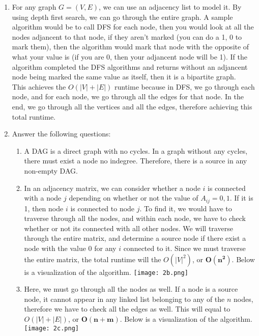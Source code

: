 \documentclass{article}
\begin{document}
    \begin{enumerate}
        \item For any graph $G = (V,E)$, we can use an adjacency list to model it. By using depth first search, we can go through the entire graph. A sample algorithm would be to call DFS for each node, then you would look at all the nodes adjancent to that node, if they aren't marked (you can do a 1, 0 to mark them), then the algorithm would mark that node with the opposite of what your value is (if you are 0, then your adjancent node will be 1). If the algorithm completed the DFS algorithms and returns without an adjancent node being marked the same value as itself, then it is a bipartite graph.\\
        This achieves the $O(|V| + |E|)$ runtime because in DFS, we go through each node, and for each node, we go through all the edges for that node. In the end, we go through all the vertices and all the edges, therefore achieving this total runtime.
        \item Answer the following questions:
        \begin{enumerate}
            \item A DAG is a direct graph with no cycles. In a graph without any cycles, there must exist a node no indegree. Therefore, there is a source in any non-empty DAG.
            \item In an adjacency matrix, we can consider whether a node $i$ is connected with a node $j$ depending on whether or not the value of $A_{ij} = 0,1$. If it is 1, then node $i$ is connected to node $j$. To find it, we would have to traverse through all the nodes, and within each node, we have to check whether or not its connected with all other nodes. We will traverse through the entire matrix, and determine a source node if there exist a node with the value $0$ for any $i$ connected to it. Since we must traverse the entire matrix, the total runtime will the $O(|V|^2)$, or $\boxed{\mathbf{O(n^2)}}$. Below is a visualization of the algorithm.
            \texttt{[image: 2b.png]}
            \item Here, we must go through all the nodes as well. If a node is a source node, it cannot appear in any linked list belonging to any of the $n$ nodes, therefore we have to check all the edges as well. This will equal to $O(|V| + |E|)$, or $\boxed{\mathbf{O(n + m)}}$. Below is a visualization of the algorithm.\\
            \texttt{[image: 2c.png]}
        \end{enumerate}

\end{enumerate}
\end{document}
